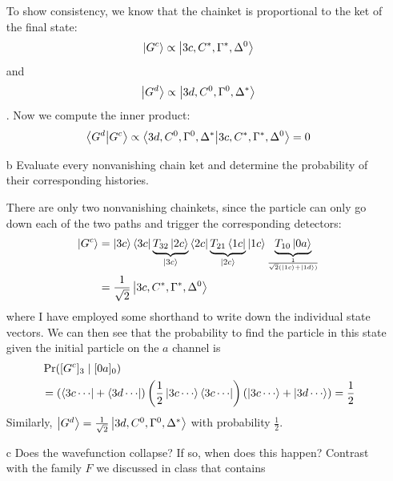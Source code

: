 \documentclass[a4paper,twoside]{article}
\begin{document}
\begin{itemize}
\begin{tcolorbox}[breakable]
            To show consistency, we know that the chainket is proportional to the ket of the final state:
            \begin{equation}
                \ket{G^c} \propto \ket{3c,C^*, \Gamma^*, \Delta^0}
            \end{equation}
            and
            \begin{equation}
                \ket{G^d} \propto \ket{3d,C^0, \Gamma^0, \Delta^*}
            \end{equation}.
            Now we compute the inner product:
            \begin{equation}
                \bra{G^d} \ket{G^c} \propto \bra{3d,C^0, \Gamma^0, \Delta^*}\ket{3c,C^*, \Gamma^*, \Delta^0} = 0
            \end{equation}
         \end{tcolorbox}
    \item[b] Evaluate every nonvanishing chain ket and determine the probability of their corresponding histories.
        \begin{tcolorbox}[breakable]
            There are only two nonvanishing chainkets, since the particle can only go down each of the two paths and trigger the corresponding detectors:
            \begin{align}
                \ket{G^c} &= \ket{3c} \bra{3c} \underbrace{ T_{32} \ket{2c} }_{\ket{3c}} \bra{2c} \underbrace{ T_{21} \bra{1c} }_{\ket{2c}} \ket{1c} \underbrace{ T_{10} \ket{0a} }_{\frac{1}{\sqrt{2} (\ket{1c} + \ket{1d})}}\\
                &= \frac{1}{\sqrt{2}} \ket{3c, C^*, \Gamma^*, \Delta^0}
            \end{align}
            where I have employed some shorthand to write down the individual state vectors. We can then see that the probability to find the particle in this state given the initial particle on the $ a $ channel is
            \begin{align}
                &\Pr([G^c]_3\mid[0a]_0)\\&= (\bra{3c\cdots} + \bra{3d\cdots})\left(\frac{1}{2}\ket{3c\cdots} \bra{3c\cdots}\right)(\ket{3c\cdots} + \ket{3d\cdots}) = \frac{1}{2}
            \end{align}
            Similarly, $ \ket{G^d} = \frac{1}{\sqrt{2}} \ket{3d,C^0, \Gamma^0, \Delta^*} $ with probability $ \frac{1}{2} $.
        \end{tcolorbox}
    \item[c] Does the wavefunction collapse? If so, when does this happen? Contrast with the family $ F $ we discussed in class that contains

\end{itemize}
\end{document}
